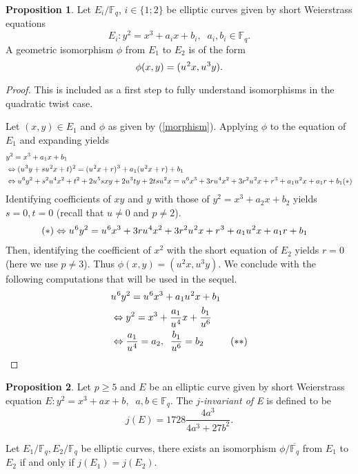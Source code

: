 \documentclass[10pt]{article}
\theoremstyle{definition}
\newtheorem{proposition}{Proposition}
\newcommand{\F}{\mathbb{F}}
\begin{document}
\begin{proposition}\label{prop:auto}
Let $E_i/\F_q$, $i \in \lbrace 1; 2 \rbrace$ be elliptic curves given by short Weierstrass equations
\[ E_i : y^2 = x^3 + a_ix + b_i, \; \; a_i,b_i \in \F_q. \]
A geometric isomorphism $\phi$ from $E_1$ to $E_2$ is of the form 
\[ \phi(x,y) = (u^{\mkern1mu 2}x, u^{\mkern1mu 3}y).\]  
\end{proposition}
\begin{proof}
This is included as a first step to fully understand isomorphisms in the quadratic twist case.

\noindent Let $(x,y) \in E_1$ and $\phi$ as given by (\ref{morphism}).
Applying $\phi$ to the equation of $E_1$ and expanding yields 
\begin{align*}
&y^2 = x^3 + a_1x + b_1\\
 & \Leftrightarrow ( u^{\mkern1mu 3}y + su^{\mkern1mu 2}x + t)^{\mkern1mu 2} =  (u^{\mkern1mu 2}x +r)^{\mkern1mu 3} +a_1(u^{\mkern1mu 2}x +r) +b_1 \\
& \Leftrightarrow  u^{\mkern1mu 6}y^2 + s^2u^{\mkern1mu 4}x^2 + t^2 + 2u^{\mkern1mu 5}sxy + 2u^{\mkern1mu 3}ty + 2tsu^{\mkern1mu 2}x  
=  u^{\mkern1mu 6}x^3 + 3ru^{\mkern1mu 4}x^2 + 3r^2 u^{\mkern1mu 2}x +r^{\mkern1mu 3} +a_1u^{\mkern1mu 2}x +a_1r +b_1 (*)\\
\end{align*} 
Identifying coefficients of $xy$ and $y$ with those of $y^2 = x^3 + a_2x + b_2$ yields $s=0, t= 0$ (recall that $u \neq 0$ and $ p \neq 2$).
\begin{align*}
(*) & \Leftrightarrow  u^{\mkern1mu 6}y^2   
=  u^{\mkern1mu 6}x^3 + 3ru^{\mkern1mu 4}x^2 + 3r^2 u^{\mkern1mu 2}x +r^{\mkern1mu 3} +a_1u^{\mkern1mu 2}x +a_1r +b_1 
\end{align*}
Then, identifying the coefficient of $x^2$ with the short equation of $E_2$ yields $r=0$ (here we use $p \neq 3$).
Thus $\phi(x,y) = (u^2x,u^3y)$.
We conclude with the following computations that will be used in the sequel.
\begin{align*}
 &u^{\mkern1mu 6}y^2   
=  u^{\mkern1mu 6}x^3 +a_1u^{\mkern1mu 2}x  +b_1 \\
& \Leftrightarrow  y^2   
=  x^3 +\frac{a_1}{u^{\mkern1mu 4}}x  + \frac{b_1}{u^6} \\
& \Leftrightarrow
\frac{a_1}{u^{\mkern1mu 4}} = a_2 , \; \;  \frac{b_1}{u^6}=b_2 \mkern50mu(**)
\end{align*}
\end{proof}


\begin{proposition}
Let $p \geq 5$ and $E$ be an elliptic curve given by short Weierstrass equation $ {E : y^2 = x^3 + ax + b, \; \; a, b \in \F_q}$.
The \textsl{$j$-invariant of E} is defined to be 
\[j(E) = 1728 \frac{4a^3}{4a^3+27b^2}.\]

\noindent Let $E_1/\F_q, E_2/\F_q$ be elliptic curves, there exists an isomorphism $\phi / \overline{\F_q}$ from $E_1$ to $E_2$ if and only if $j(E_1) = j(E_2)$. 
\end{proposition}
\end{document}
